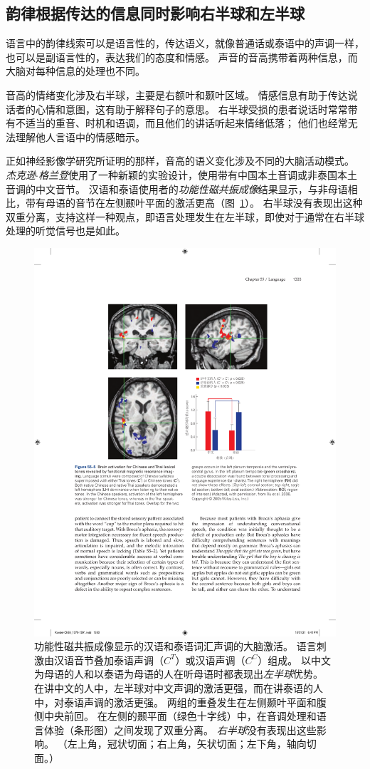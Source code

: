 \subsection{韵律根据传达的信息同时影响右半球和左半球}

语言中的韵律线索可以是语言性的，传达语义，就像普通话或泰语中的声调一样，也可以是副语言性的，表达我们的态度和情感。
声音的音高携带着两种信息，而大脑对每种信息的处理也不同。


音高的情绪变化涉及右半球，主要是右额叶和颞叶区域。
情感信息有助于传达说话者的心情和意图，这有助于解释句子的意思。
右半球受损的患者说话时常常带有不适当的重音、时机和语调，而且他们的讲话听起来情绪低落；
他们也经常无法理解他人言语中的情感暗示。


正如神经影像学研究所证明的那样，音高的语义变化涉及不同的大脑活动模式。
\textit{杰克逊$\cdot$格兰登}使用了一种新颖的实验设计，使用带有中国本土音调或非泰国本土音调的中文音节。
汉语和泰语使用者的\textit{功能性磁共振成像}结果显示，与非母语相比，带有母语的音节在左侧颞叶平面的激活更高（图~\ref{fig:55_5}）。
右半球没有表现出这种双重分离，支持这样一种观点，即语言处理发生在左半球，即使对于通常在右半球处理的听觉信号也是如此。


\begin{figure}[htbp]
	\centering
	\includegraphics[width=0.88\linewidth]{chap55/fig_55_5}
	\caption{功能性磁共振成像显示的汉语和泰语词汇声调的大脑激活。
		语言刺激由汉语音节叠加泰语声调（$ C^T $）或汉语声调（$ C^C $）组成。
		以中文为母语的人和以泰语为母语的人在听母语时都表现出\textit{左半球}优势。
		在讲中文的人中，左半球对中文声调的激活更强，而在讲泰语的人中，对泰语声调的激活更强。
		两组的重叠发生在左侧颞叶平面和腹侧中央前回。
		在左侧的颞平面（绿色十字线）中，在音调处理和语言体验（条形图）之间发现了双重分离。
		\textit{右半球}没有表现出这些影响\cite{xu2006activation}。
		（左上角，冠状切面；右上角，矢状切面；左下角，轴向切面。）}
	\label{fig:55_5}
\end{figure}


